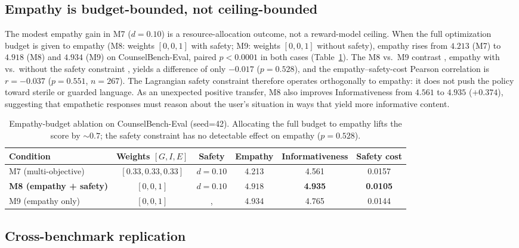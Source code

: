 \documentclass[10pt,twocolumn]{article}
\begin{document}
\subsection*{Empathy is budget-bounded, not ceiling-bounded}

The modest empathy gain in M7 ($d=0.10$) is a resource-allocation outcome, not a reward-model ceiling. When the full optimization budget is given to empathy (M8: weights $[0,0,1]$ with safety; M9: weights $[0,0,1]$ without safety), empathy rises from $4.213$ (M7) to $\mathbf{4.918}$ (M8) and $\mathbf{4.934}$ (M9) on CounselBench-Eval, paired $p<0.0001$ in both cases (Table~\ref{tab:empathy_ablation}). The M8 vs.\ M9 contrast ,  empathy with vs.\ without the safety constraint ,  yields a difference of only $-0.017$ ($p=0.528$), and the empathy--safety-cost Pearson correlation is $r=-0.037$ ($p=0.551$, $n=267$). The Lagrangian safety constraint therefore operates orthogonally to empathy: it does not push the policy toward sterile or guarded language. As an unexpected positive transfer, M8 also improves Informativeness from $4.561$ to $4.935$ ($+0.374$), suggesting that empathetic responses must reason about the user's situation in ways that yield more informative content.

\begin{table}[!t]
\centering
\small
\begin{tabular}{lccccc}
\toprule
Condition & Weights $[G, I, E]$ & Safety & Empathy & Informativeness & Safety cost \\
\midrule
M7 (multi-objective)        & $[0.33, 0.33, 0.33]$ & $d=0.10$ & 4.213 & 4.561 & 0.0157 \\
\textbf{M8 (empathy + safety)} & $[0, 0, 1]$       & $d=0.10$ & $\mathbf{4.918}$ & \textbf{4.935} & \textbf{0.0105} \\
M9 (empathy only)           & $[0, 0, 1]$          & ,       & 4.934 & 4.765 & 0.0144 \\
\bottomrule
\end{tabular}
\caption{Empathy-budget ablation on CounselBench-Eval (seed=42). Allocating the full budget to empathy lifts the score by ${\sim}0.7$; the safety constraint has no detectable effect on empathy ($p=0.528$).}
\label{tab:empathy_ablation}
\end{table}

\subsection*{Cross-benchmark replication}
\end{document}
